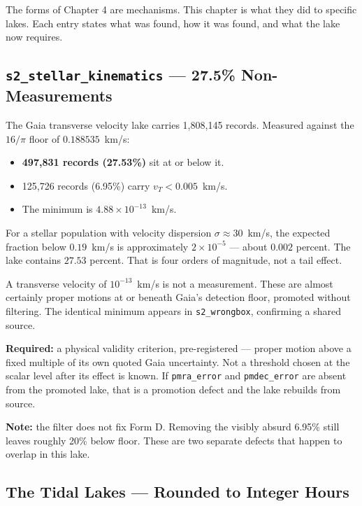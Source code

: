 \documentclass[11pt, letterpaper, openany]{book}
\begin{document}
The forms of Chapter 4 are mechanisms. This chapter is what they did to specific lakes. Each
entry states what was found, how it was found, and what the lake now requires.

\subsection{\texttt{s2\_stellar\_kinematics} --- 27.5\% Non-Measurements}

The Gaia transverse velocity lake carries 1{,}808{,}145 records. Measured against the $16/\pi$
floor of $0.188535$~km/s:

\begin{itemize}
    \item \textbf{497{,}831 records (27.53\%)} sit at or below it.
    \item 125{,}726 records (6.95\%) carry $v_T < 0.005$~km/s.
    \item The minimum is $4.88 \times 10^{-13}$~km/s.
\end{itemize}

For a stellar population with velocity dispersion $\sigma \approx 30$~km/s, the expected
fraction below $0.19$~km/s is approximately $2 \times 10^{-5}$ --- about $0.002$ percent. The
lake contains $27.53$ percent. That is four orders of magnitude, not a tail effect.

\begin{nullbox}
A transverse velocity of $10^{-13}$~km/s is not a measurement. These are almost certainly
proper motions at or beneath Gaia's detection floor, promoted without filtering. The identical
minimum appears in \texttt{s2\_wrongbox}, confirming a shared source.
\end{nullbox}

\textbf{Required:} a physical validity criterion, pre-registered --- proper motion above a fixed
multiple of its own quoted Gaia uncertainty. Not a threshold chosen at the scalar level after
its effect is known. If \texttt{pmra\_error} and \texttt{pmdec\_error} are absent from the
promoted lake, that is a promotion defect and the lake rebuilds from source.

\textbf{Note:} the filter does not fix Form D. Removing the visibly absurd 6.95\% still leaves
roughly 20\% below floor. These are two separate defects that happen to overlap in this lake.

\subsection{The Tidal Lakes --- Rounded to Integer Hours}
\end{document}
